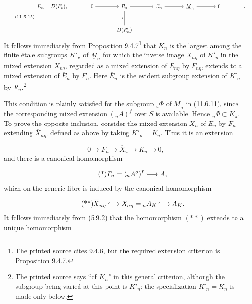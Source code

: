 \begin{equation}\tag{11.6.15}
\begin{tikzcd}[column sep=large, row sep=large]
E_n=D(F_n),
 & 0 \arrow[r]
 & R_n \arrow[r] \arrow[d, no head, "\wr"']
 & E_n \arrow[r]
 & \underline M_n \arrow[r]
 & 0
 & {.} \\
{}
 & {}
 & D(R'_n)
 & {}
 & {}
 & {}
 & {}
\end{tikzcd}
\end{equation}
It follows immediately from Proposition 9.4.7\footnote{The printed
source cites 9.4.6, but the required extension criterion is Proposition
9.4.7.} that $K_n$ is the largest among the finite \'etale subgroups
$K'_n$ of $\underline M_n$ for which the inverse image
$\overline X_{n\eta}$ of $K'_n$ in the mixed extension $X_{n\eta}$,
regarded as a mixed extension of $\overline E_{n\eta}$ by $F_{n\eta}$,
extends to a mixed extension of $\overline E_n$ by $F_n$. Here
$\overline E_n$ is the evident subgroup extension of $K'_n$ by
$R_n$.\footnote{The printed source says ``of $K_n$'' in this general
criterion, although the subgroup being varied at this point is $K'_n$;
the specialization $K'_n=K_n$ is made only below.}

This condition is plainly satisfied for the subgroup ${}_n\Phi$ of
$\underline M_n$ in (11.6.11), since the corresponding mixed extension
$({}_nA)^f$ over $S$ is available. Hence ${}_n\Phi\subset K_n$. To
prove the opposite inclusion, consider the mixed extension
$\overline X_n$ of $\overline E_n$ by $F_n$ extending
$\overline X_{n\eta}$, defined as above by taking $K'_n=K_n$. Thus it
is an extension

\begin{equation*}
0\longrightarrow F_n\longrightarrow\overline X_n
 \longrightarrow K_n\longrightarrow0,
\end{equation*}
and there is a canonical homomorphism

\begin{equation}\tag{*}
F_n=({}_nA^o)^f\lhook\joinrel\longrightarrow A,
\end{equation}
which on the generic fibre is induced by the canonical homomorphism

\begin{equation}\tag{**}
\overline X_{n\eta}\lhook\joinrel\longrightarrow X_{n\eta}
 ={}_nA_K\lhook\joinrel\longrightarrow A_K.
\end{equation}
It follows immediately from (5.9.2) that the homomorphism $(**)$ extends
to a unique homomorphism

